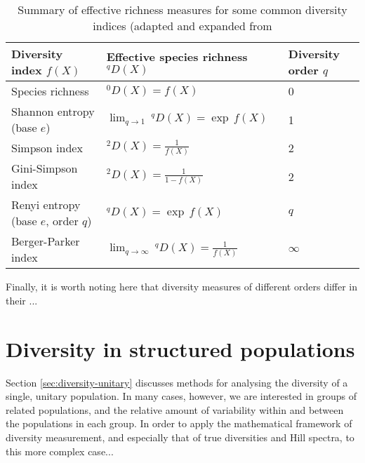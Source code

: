 \begin{table}
\centering
\caption{Summary of effective richness measures for some common diversity indices (adapted and expanded from \citep{jost2006entropy}}
\begin{tabular}{lll}\toprule
Diversity index $f(X)$ & Effective species richness~$^qD(X)$ & Diversity order $q$\\\midrule
Species richness & $^0D(X) = f(X)$ & 0 \\
Shannon entropy (base $e$) & $\lim_{q \to 1}~^qD(X) = \exp\,f(X)$ & 1\\
Simpson index & $^2D(X) = \frac{1}{f(X)}$ & 2\\
Gini-Simpson index & $^2D(X) = \frac{1}{1-f(X)}$ & 2\\
Renyi entropy (base $e$, order $q$) & $^qD(X) = \exp\,f(X)$ & $q$\\
Berger-Parker index & $\lim_{q \to \infty}~^qD(X) = \frac{1}{f(X)}$ & $\infty$\\
\bottomrule
\end{tabular}
\label{tab:diversity}
\end{table}

Finally, it is worth noting here that diversity measures of different orders differ in their ... %

\section{Diversity in structured populations}
\label{sec:diversity-structured}

Section \ref{sec:diversity-unitary} discusses methods for analysing the diversity of a single, unitary population. In many cases, however, we are interested in groups of related populations, and the relative amount of variability within and between the populations in each group. In order to apply the mathematical framework of diversity measurement, and especially that of true diversities and Hill spectra, to this more complex case...

%
%

